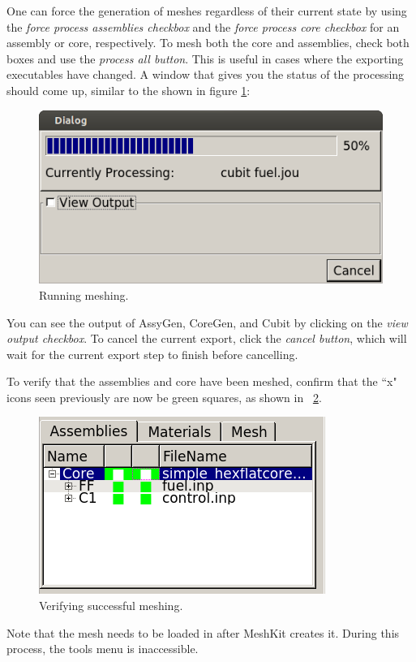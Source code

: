
One can force the generation of meshes regardless of their current state by using the \emph{force process assemblies checkbox} and the \emph{force process core checkbox} for an assembly or core, respectively.  To mesh both the core and assemblies, check both boxes and use the \emph{process all button}.  This is useful in cases where the exporting executables have changed.  A window that gives you the status of the processing should come up, similar to the shown in figure \ref{fig:Mesh5}:

\begin{figure}[H]
	\begin{center}
		\includegraphics[width=0.5\linewidth]{Images/mesh-5.png}
		\caption{Running meshing.}
		\label{fig:Mesh5}
	\end{center}
\end{figure}

You can see the output of AssyGen, CoreGen, and Cubit by clicking on the \emph{view output checkbox}.  To cancel the current export, click the \emph{cancel button}, which will wait for the current export step to finish before cancelling.

To verify that the assemblies and core have been meshed, confirm that the ``x" icons seen previously are now be green squares, as shown in ~\ref{fig:Mesh6}.

\begin{figure}[H]
	\begin{center}
		\includegraphics[width=0.5\linewidth]{Images/mesh-6.png}
		\caption{Verifying successful meshing.}
		\label{fig:Mesh6}
	\end{center}
\end{figure}

Note that the mesh needs to be loaded in after MeshKit creates it.  During this process, the tools menu is inaccessible.